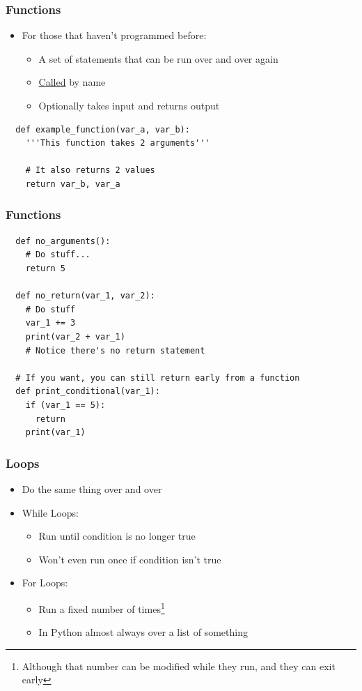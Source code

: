 \documentclass[aspectratio=169]{beamer}
\begin{document}
\begin{frame}[fragile]
  \frametitle{Functions}
  \begin{itemize}
    \item For those that haven't programmed before:
    \begin{itemize}
      \item A set of statements that can be run over and over again
      \item \underline{Called} by name
      \item Optionally takes input and returns output
    \end{itemize}
  \end{itemize}
  \pause
  \begin{verbatim}
  def example_function(var_a, var_b):
    '''This function takes 2 arguments'''

    # It also returns 2 values
    return var_b, var_a
  \end{verbatim}
\end{frame}
\begin{frame}[fragile]
  \frametitle{Functions}
  \begin{verbatim}
  def no_arguments():
    # Do stuff...
    return 5
  
  def no_return(var_1, var_2):
    # Do stuff
    var_1 += 3
    print(var_2 + var_1)
    # Notice there's no return statement
  
  # If you want, you can still return early from a function
  def print_conditional(var_1):
    if (var_1 == 5):
      return
    print(var_1)
  \end{verbatim}
\end{frame}
\begin{frame}
  \frametitle{Loops}
  \begin{itemize}
    \item Do the same thing over and over
    \pause
    \item While Loops:
    \begin{itemize}
      \item Run until condition is no longer true
      \item Won't even run once if condition isn't true
    \end{itemize}
    \pause
    \item For Loops:
      \begin{itemize}
        \item Run a fixed number of times\footnote{Although that number can be modified while they run, and they can exit early}
        \item In Python almost always over a list of something
      \end{itemize}
  \end{itemize}
\end{frame}
\end{document}
